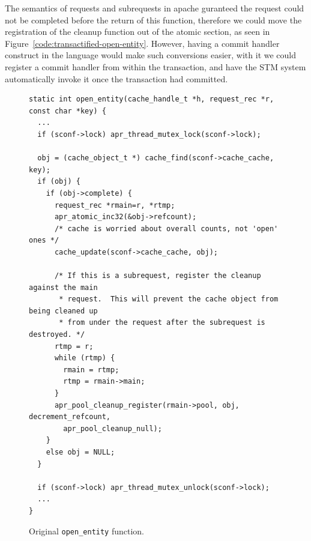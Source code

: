 \documentclass[preprint,11pt]{sigplanconf}
\begin{document}
The semantics of requests and subrequests in apache guranteed the request
could not be completed before the return of this function, therefore we could
move the registration of the cleanup function out of the atomic section, as seen
in Figure~\ref{code:transactified-open-entity}. However, having a commit
handler construct in the language would make such conversions easier, with it we
could register a commit handler from within the transaction, and have the STM
system automatically invoke it once the transaction had committed.

\begin{figure}
\begin{lstlisting}
static int open_entity(cache_handle_t *h, request_rec *r, const char *key) {
  ...
  if (sconf->lock) apr_thread_mutex_lock(sconf->lock);

  obj = (cache_object_t *) cache_find(sconf->cache_cache, key);
  if (obj) {
    if (obj->complete) {
      request_rec *rmain=r, *rtmp;
      apr_atomic_inc32(&obj->refcount);
      /* cache is worried about overall counts, not 'open' ones */
      cache_update(sconf->cache_cache, obj);

      /* If this is a subrequest, register the cleanup against the main
       * request.  This will prevent the cache object from being cleaned up
       * from under the request after the subrequest is destroyed. */
      rtmp = r;
      while (rtmp) {
        rmain = rtmp;
        rtmp = rmain->main;
      }
      apr_pool_cleanup_register(rmain->pool, obj, decrement_refcount, 
        apr_pool_cleanup_null);
    }
    else obj = NULL;
  }

  if (sconf->lock) apr_thread_mutex_unlock(sconf->lock);
  ...
}
\end{lstlisting}
\caption{Original {\tt open\_entity} function.}
\label{code:original-open-entity}
\end{figure}
\end{document}
